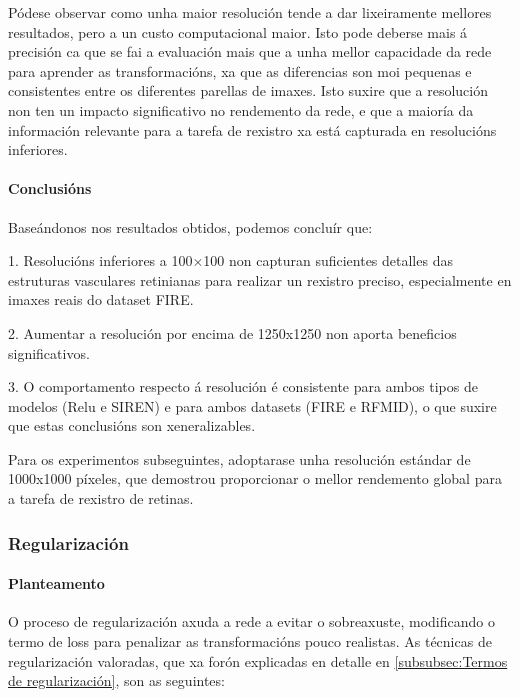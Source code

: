Pódese observar como unha maior resolución tende a dar lixeiramente mellores resultados, pero a un custo computacional maior.
Isto pode deberse mais á precisión ca que se fai a evaluación mais que a unha mellor capacidade da rede para aprender as transformacións, xa que as diferencias son moi pequenas e consistentes entre os diferentes parellas de imaxes.
Isto suxire que a resolución non ten un impacto significativo no rendemento da rede, e que a maioría da información relevante para a tarefa de rexistro xa está capturada en resolucións inferiores.


\paragraph{Conclusións}
\label{par:Conclusions-resolution}

Baseándonos nos resultados obtidos, podemos concluír que:

1. Resolucións inferiores a 100×100 non capturan suficientes detalles das estruturas vasculares retinianas para realizar un rexistro preciso, especialmente en imaxes reais do dataset FIRE.

2. Aumentar a resolución por encima de 1250x1250 non aporta beneficios significativos.

3. O comportamento respecto á resolución é consistente para ambos tipos de modelos (Relu e SIREN) e para ambos datasets (FIRE e RFMID), o que suxire que estas conclusións son xeneralizables.

Para os experimentos subseguintes, adoptarase unha resolución estándar de 1000x1000 píxeles, que demostrou proporcionar o mellor rendemento global para a tarefa de rexistro de retinas.

\subsubsection{Regularización}
\label{subsubsec:Regularización}

\paragraph{Planteamento}
\label{par:Planteamento-regularization}
O proceso de regularización axuda a rede a evitar o sobreaxuste, modificando o termo de loss para penalizar as transformacións pouco realistas.
As técnicas de regularización valoradas, que xa forón explicadas en detalle en \ref{subsubsec:Termos de regularización}, son as seguintes:

